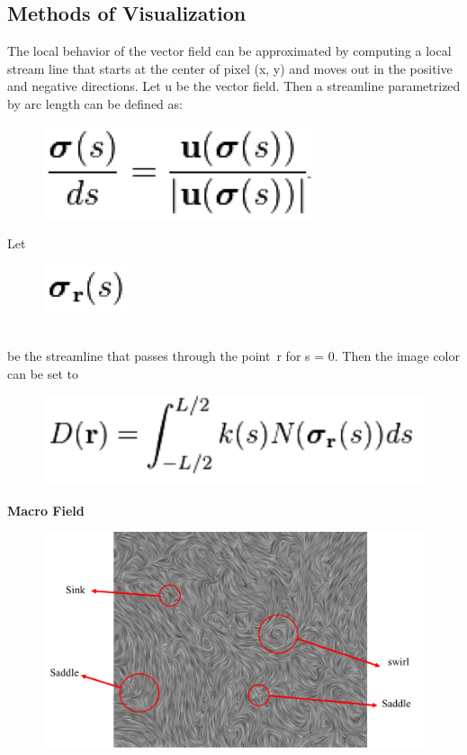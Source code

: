 \documentclass[letterpaper,12pt,titlepage,fleqn]{article}
\begin{document}
\begin{CJK}{UTF8}{gkai}
\section{Methods of Visualization}
The local behavior of the vector field can be approximated by computing a local stream line that starts at the center of pixel (x, y) and moves out in the positive and negative directions.
Let u be the vector field. Then a streamline parametrized by arc length can be defined as:

\begin{figure}[!h]
	\centering
	\includegraphics[width= 0.2\linewidth ]{pic3.png}

\end{figure}

Let
\begin{figure}[!h]
	\centering
	\includegraphics[width= 0.05\linewidth ]{pic4.png}

\end{figure}
 \\ be the streamline that passes through the point r for s = 0. Then the image color can be set to 

\begin{figure}[!h]
	\centering
	\includegraphics[width= 0.5\linewidth ]{pic5.png}
\end{figure}

\textbf{Macro Field}
\begin{figure}[!h]
	\centering
	\includegraphics[width= 0.7\linewidth ]{pic6.png}
\end{figure}


\end{CJK}
\end{document}
